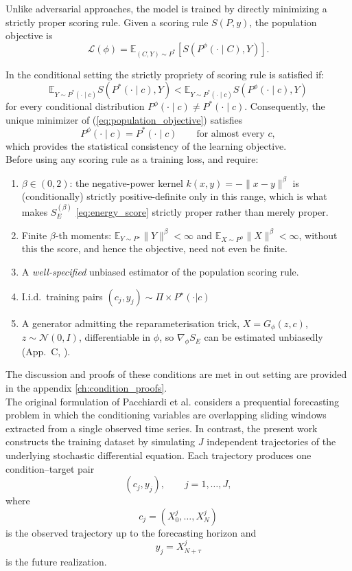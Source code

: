 Unlike adversarial approaches, the model is trained by directly minimizing a strictly proper scoring rule. Given a scoring rule $S(P,y)$, the population objective is
\begin{equation}
\label{eq:population_objective}
\mathcal{L}(\phi)
=
\mathbb{E}_{(C,Y)\sim P^*}
\left[
S\!\left(P^\phi(\cdot\mid C),Y\right)
\right].
\end{equation}

In the conditional setting the strictly propriety of scoring rule is satisfied if:
\[
\mathbb{E}_{Y\sim P^*(\cdot\mid c)}
S(P^*(\cdot\mid c),Y)
<
\mathbb{E}_{Y\sim P^*(\cdot\mid c)}
S(P^\phi(\cdot\mid c),Y)
\]
for every conditional distribution
$
P^\phi(\cdot\mid c)\neq P^*(\cdot\mid c).
$
Consequently, the unique minimizer of (\ref{eq:population_objective}) satisfies
\[
P^\phi(\cdot\mid c)=P^*(\cdot\mid c)
\qquad
\text{for almost every }c,
\]
which provides the statistical consistency of the learning objective.\\


Before using any scoring rule as a training loss, \cite{srforgan:srforgan} and \cite{background:scoring_rules} require:

\begin{enumerate}
    \label{ES_conditions}
\item $\beta\in(0,2)$: the negative-power kernel $k(x,y)=-\|x-y\|^\beta$ is (conditionally) strictly positive-definite only in this range, which is what makes $S_E^{(\beta)}$ \ref{eq:energy_score} strictly proper rather than merely proper.
\item Finite $\beta$-th moments: $\mathbb{E}_{Y\sim P^\star}\|Y\|^\beta<\infty$ and $\mathbb{E}_{X\sim P^\phi}\|X\|^\beta<\infty$, without this the score, and hence the objective, need not even be finite.
\item A \emph{well-specified} unbiased estimator of the population scoring rule.
\item I.i.d.\ training pairs $(c_j,y_j)\sim\Pi\times P^\star(\cdot|c)$ 
\item A generator admitting the reparameterisation trick, $X=G_\phi(z,c)$, $z\sim\mathcal N(0,I)$, differentiable in $\phi$, so $\nabla_\phi S_E$ can be estimated unbiasedly (App.~C, \cite{srforgan:srforgan}).
\end{enumerate}
The discussion and proofs of these conditions are met in out setting are provided in the appendix \ref{ch:condition_proofs}.\\


The original formulation of Pacchiardi et al. \cite{srforgan:srforgan} considers a prequential forecasting problem in which the conditioning variables are overlapping sliding windows extracted from a single observed time series. 
In contrast, the present work constructs the training dataset by simulating $J$ independent trajectories of the underlying stochastic differential equation. 
Each trajectory produces one condition--target pair
\[
(c_j,y_j),
\qquad
j=1,\ldots,J,
\]
where
\[
c_j
=
(X_0^j,\ldots,X_N^j)
\]
is the observed trajectory up to the forecasting horizon and
\[
y_j
=
X_{N+\tau}^j
\]
is the future realization.



